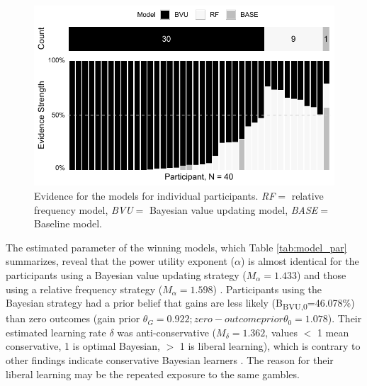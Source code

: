 \documentclass[a4paper, man, floatsintext]{apa6}
\begin{document}
\begin{figure}

{\centering \includegraphics{../figures/model_weights-1} 

}

\caption{Evidence for the models for individual participants. \textit{RF}$=$ relative frequency model, \textit{BVU}$=$ Bayesian value updating model, \textit{BASE}$=$ Baseline model.}\label{fig:model_weights}
\end{figure}

The estimated parameter of the winning models, which Table
\ref{tab:model_par} summarizes, reveal that the power utility exponent
(\(\alpha\)) is almost identical for the participants using a Bayesian
value updating strategy (\(M_{\alpha}= 1.433\)) and those using a
relative frequency strategy (\(M_{\alpha}=1.598\)) . Participants using
the Bayesian strategy had a prior belief that gains are less likely
(B\textsubscript{BVU,0}=46.078\%) than zero outcomes (gain prior
\(\theta_G = 0.922; zero-outcome prior \theta_0 = 1.078\)). Their
estimated learning rate \(\delta\) was anti-conservative
(\(M_{\delta}=1.362\), values \(<\) 1 mean conservative, 1 is optimal
Bayesian, \(>\) 1 is liberal learning), which is contrary to other
findings indicate conservative Bayesian learners
\citep{Edwards1967,Tauber2017}. The reason for their liberal learning
may be the repeated exposure to the same gambles.
\end{document}
